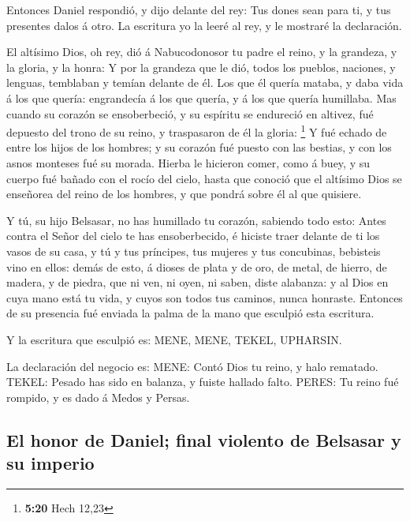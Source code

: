  Entonces Daniel respondió, y dijo delante del rey: Tus
dones sean para ti, y tus presentes dalos á otro. La escritura yo la
leeré al rey, y le mostraré la declaración.

 El altísimo Dios, oh rey, dió á Nabucodonosor tu padre el
reino, y la grandeza, y la gloria, y la honra:  Y por la
grandeza que le dió, todos los pueblos, naciones, y lenguas, temblaban y
temían delante de él. Los que él quería mataba, y daba vida á los que
quería: engrandecía á los que quería, y á los que quería humillaba.
 Mas cuando su corazón se ensoberbeció, y su espíritu se
endureció en altivez, fué depuesto del trono de su reino, y traspasaron
de él la gloria: \footnote{\textbf{5:20} Hech 12,23}  Y fué
echado de entre los hijos de los hombres; y su corazón fué puesto con
las bestias, y con los asnos monteses fué su morada. Hierba le hicieron
comer, como á buey, y su cuerpo fué bañado con el rocío del cielo, hasta
que conoció que el altísimo Dios se enseñorea del reino de los hombres,
y que pondrá sobre él al que quisiere.

 Y tú, su hijo Belsasar, no has humillado tu corazón,
sabiendo todo esto:  Antes contra el Señor del cielo te has
ensoberbecido, é hiciste traer delante de ti los vasos de su casa, y tú
y tus príncipes, tus mujeres y tus concubinas, bebisteis vino en ellos:
demás de esto, á dioses de plata y de oro, de metal, de hierro, de
madera, y de piedra, que ni ven, ni oyen, ni saben, diste alabanza: y al
Dios en cuya mano está tu vida, y cuyos son todos tus caminos, nunca
honraste.  Entonces de su presencia fué enviada la palma de
la mano que esculpió esta escritura.

 Y la escritura que esculpió es: MENE, MENE, TEKEL,
UPHARSIN.

 La declaración del negocio es: MENE: Contó Dios tu reino,
y halo rematado.  TEKEL: Pesado has sido en balanza, y
fuiste hallado falto.  PERES: Tu reino fué rompido, y es
dado á Medos y Persas.

\hypertarget{el-honor-de-daniel-final-violento-de-belsasar-y-su-imperio}{%
\subsection{El honor de Daniel; final violento de Belsasar y su
imperio}\label{el-honor-de-daniel-final-violento-de-belsasar-y-su-imperio}}


